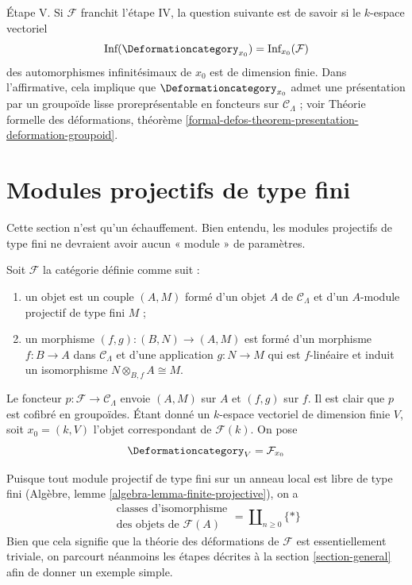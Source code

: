 \medskip\noindent
Étape V. Si $\mathcal{F}$ franchit l'étape IV, la question suivante est de savoir
si le $k$-espace vectoriel
$$
\text{Inf}(\Deformationcategory_{x_0}) = \text{Inf}_{x_0}(\mathcal{F})
$$
des automorphismes infinitésimaux de $x_0$ est de dimension finie.
Dans l'affirmative, cela implique que
$\Deformationcategory_{x_0}$ admet une présentation par un
groupoïde lisse proreprésentable en foncteurs sur $\mathcal{C}_\Lambda$ ; voir
Théorie formelle des déformations, théorème
\ref{formal-defos-theorem-presentation-deformation-groupoid}.





\section{Modules projectifs de type fini}
\label{section-finite-projective-modules}

\noindent
Cette section n'est qu'un échauffement. Bien entendu, les modules projectifs
de type fini ne devraient avoir aucun « module » de paramètres.

\begin{example}
\label{example-finite-projective-modules}
Soit $\mathcal{F}$ la catégorie définie comme suit :
\begin{enumerate}
\item un objet est un couple $(A, M)$ formé d'un
objet $A$ de $\mathcal{C}_\Lambda$ et d'un $A$-module
projectif de type fini $M$ ;
\item un morphisme $(f, g) : (B, N) \to (A, M)$ est formé d'un
morphisme $f : B \to A$ dans $\mathcal{C}_\Lambda$ et
d'une application $g : N \to M$ qui est $f$-linéaire et induit
un isomorphisme $N \otimes_{B, f} A \cong M$.
\end{enumerate}
Le foncteur $p : \mathcal{F} \to \mathcal{C}_\Lambda$ envoie $(A, M)$ sur $A$
et $(f, g)$ sur $f$. Il est clair que $p$ est cofibré en groupoïdes.
Étant donné un $k$-espace vectoriel de dimension finie $V$,
soit $x_0 = (k, V)$ l'objet correspondant de $\mathcal{F}(k)$.
On pose
$$
\Deformationcategory_V = \mathcal{F}_{x_0}
$$
\end{example}

\noindent
Puisque tout module projectif de type fini sur un anneau local est libre
de type fini (Algèbre, lemme \ref{algebra-lemma-finite-projective}), on a
$$
\begin{matrix}
\text{classes d'isomorphisme} \\
\text{des objets de }\mathcal{F}(A)
\end{matrix}
= \coprod\nolimits_{n \geq 0} \{*\}
$$
Bien que cela signifie que la théorie des déformations de $\mathcal{F}$
est essentiellement triviale, on parcourt néanmoins les étapes décrites
à la section \ref{section-general} afin de donner un exemple simple.

